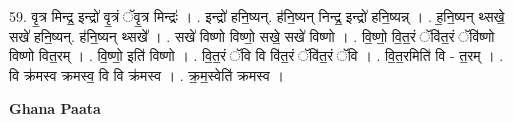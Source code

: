 \documentclass[17pt]{extarticle}
\begin{document}
59. वृ॒त्र मिन्द्र॒ इन्द्रो॑ वृ॒त्रं ॅवृ॒त्र मिन्द्रः॑ । . इन्द्रो॑ हनि॒ष्यन्. ह॑नि॒ष्यन् निन्द्र॒ इन्द्रो॑ हनि॒ष्यन्न् । . ह॒नि॒ष्यन् थ्सखे॒ सखे॑ हनि॒ष्यन्. ह॑नि॒ष्यन् थ्सखे᳚ । . सखे॑ विष्णो विष्णो॒ सखे॒ सखे॑ विष्णो । . वि॒ष्णो॒ वि॒त॒रं ॅवि॑त॒रं ॅवि॑ष्णो विष्णो वित॒रम् । . वि॒ष्णो॒ इति॑ विष्णो । . वि॒त॒रं ॅवि वि वि॑त॒रं ॅवि॑त॒रं ॅवि । . वि॒त॒रमिति॑ वि - त॒रम् । . वि क्र॑मस्व क्रमस्व॒ वि वि क्र॑मस्व । . क्र॒म॒स्वेति॑ क्रमस्व । \newline

\textbf{Ghana Paata } \newline
\end{document}

